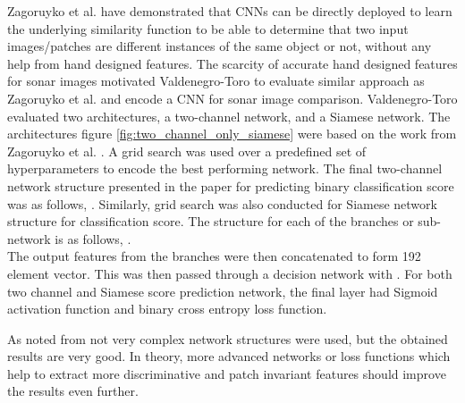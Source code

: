 Zagoruyko et al. have demonstrated that CNNs can be directly deployed to learn the underlying similarity function to be able to determine that two input images/patches are different instances of the same object or not, 
without any help from hand designed features. The scarcity of accurate hand designed features for sonar images motivated Valdenegro-Toro to evaluate similar approach as Zagoruyko et al. and encode a CNN for sonar image comparison.
Valdenegro-Toro \cite{stateoftheart} evaluated two architectures, a two-channel network, and a Siamese network. The architectures figure \ref{fig:two_channel_only_siamese} were based on the work from Zagoruyko et al. \cite{zagoruyko2015learning}.
A grid search was used over a predefined set of hyperparameters to encode the best performing network. The final two-channel network structure presented in the paper for predicting binary classification score was as follows,
. Similarly, grid search was also conducted for Siamese network structure for classification score. 
The structure for each 
of the branches or sub-network is as follows, .\\ The output features from the branches were then concatenated to form 192 
element vector. This was then passed through a decision network with . For both two channel and Siamese score prediction network, the final  layer had Sigmoid \cite{kerassigmoid} activation function and 
binary cross entropy loss \cite{kerascrossentropy} function. 

As noted from \cite{stateoftheart} not very complex network structures were used, but the obtained results are very good. %
In theory, more advanced networks or loss functions which help to extract more discriminative and patch invariant features should improve the results even further. 